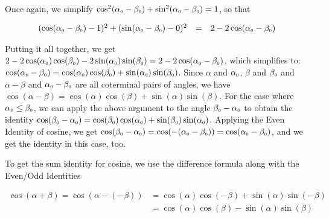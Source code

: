 Once again, we simplify $\cos^2(\alpha_{\mbox{\tiny $0$}} - \beta_{\mbox{\tiny $0$}}) + \sin^2(\alpha_{\mbox{\tiny $0$}} - \beta_{\mbox{\tiny $0$}})= 1$, so that

\[ \begin{array}{rcl}
(\cos(\alpha_{\mbox{\tiny $0$}} - \beta_{\mbox{\tiny $0$}}) - 1)^2 + (\sin(\alpha_{\mbox{\tiny $0$}} - \beta_{\mbox{\tiny $0$}}) - 0)^2 & = & 2  - 2\cos(\alpha_{\mbox{\tiny $0$}} - \beta_{\mbox{\tiny $0$}}) \\ \end{array} \]

Putting it all together, we get $2  - 2\cos(\alpha_{\mbox{\tiny $0$}})\cos(\beta_{\mbox{\tiny $0$}}) - 2\sin(\alpha_{\mbox{\tiny $0$}})\sin(\beta_{\mbox{\tiny $0$}}) = 2  - 2\cos(\alpha_{\mbox{\tiny $0$}} - \beta_{\mbox{\tiny $0$}})$, which simplifies to: $\cos(\alpha_{\mbox{\tiny $0$}} - \beta_{\mbox{\tiny $0$}}) = \cos(\alpha_{\mbox{\tiny $0$}})\cos(\beta_{\mbox{\tiny $0$}}) + \sin(\alpha_{\mbox{\tiny $0$}})\sin(\beta_{\mbox{\tiny $0$}})$.  Since $\alpha$ and $\alpha_{\mbox{\tiny $0$}}$, $\beta$ and $\beta_{\mbox{\tiny $0$}}$ and $\alpha - \beta$ and $\alpha_{\mbox{\tiny $0$}}- \beta_{\mbox{\tiny $0$}}$ are all coterminal pairs of angles, we have $\cos(\alpha - \beta) = \cos(\alpha) \cos(\beta) + \sin(\alpha) \sin(\beta)$.  For the case where $\alpha_{\mbox{\tiny $0$}} \leq \beta_{\mbox{\tiny $0$}}$, we can apply the above argument to the angle $\beta_{\mbox{\tiny $0$}} - \alpha_{\mbox{\tiny $0$}}$ to obtain the identity  $\cos(\beta_{\mbox{\tiny $0$}} - \alpha_{\mbox{\tiny $0$}}) = \cos(\beta_{\mbox{\tiny $0$}})\cos(\alpha_{\mbox{\tiny $0$}}) + \sin(\beta_{\mbox{\tiny $0$}})\sin(\alpha_{\mbox{\tiny $0$}})$.  Applying the Even Identity of cosine, we get $\cos(\beta_{\mbox{\tiny $0$}} - \alpha_{\mbox{\tiny $0$}}) = \cos( - (\alpha_{\mbox{\tiny $0$}} - \beta_{\mbox{\tiny $0$}})) = \cos(\alpha_{\mbox{\tiny $0$}} - \beta_{\mbox{\tiny $0$}})$, and we get the identity in this case, too.   

\medskip

To get the sum identity for cosine, we use the difference formula along with the Even/Odd Identities

\begin{align*}
\cos(\alpha + \beta) = \cos(\alpha - (-\beta)) &= \cos(\alpha) \cos(-\beta) + \sin(\alpha) \sin(-\beta)\\
& = \cos(\alpha) \cos(\beta) - \sin(\alpha) \sin(\beta)
\end{align*}

